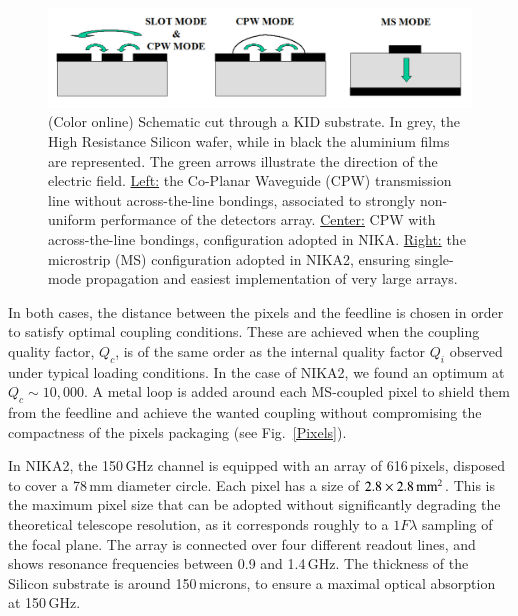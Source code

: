 \documentclass[]{aa} %
\begin{document}
\begin{figure}[h]
   \centering
    \includegraphics[width=.95\linewidth]{CPWvsMS.png}
      \caption{(Color online) Schematic cut through a KID substrate. In grey, the High Resistance Silicon wafer, while in black the aluminium films are represented. The green arrows illustrate the direction of the electric field. \underline{Left:} the Co-Planar Waveguide (CPW) transmission line without across-the-line bondings, associated to strongly non-uniform performance of the detectors array. \underline{Center:} CPW with across-the-line bondings, configuration adopted in NIKA. \underline{Right:} the microstrip (MS) configuration adopted in NIKA2, ensuring single-mode propagation and easiest implementation of very large arrays.}
         \label{CPWvsMS}
\end{figure}

In both cases, the distance between the pixels and the feedline is chosen in order to satisfy optimal coupling conditions. These are achieved when the coupling quality factor, $Q_c$, is of the same order as the internal quality factor $Q_i$ observed under typical loading conditions. In the case of NIKA2, we found an optimum at $Q_c\sim10,000$. A metal loop is added around each MS-coupled pixel to shield them from the feedline and achieve the wanted coupling without compromising the compactness of the pixels packaging (see Fig.~\ref{Pixels}). 

In NIKA2, the 150\,GHz channel is equipped with an array of 616\,pixels, disposed to cover a 78\,mm diameter circle. Each pixel has a size of $2.8\times2.8\textrm{\,mm}^2$. This is the maximum pixel size that can be adopted without significantly degrading the theoretical telescope resolution, as it corresponds roughly to a $1 F \lambda$ sampling of the focal plane. The array is connected over four different readout lines, and shows resonance frequencies between 0.9 and 1.4\,GHz. The thickness of the Silicon substrate is around 150\,microns, to ensure a maximal optical absorption at 150\,GHz. 
\end{document}
